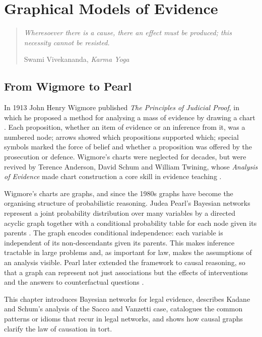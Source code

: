 \chapter{Graphical Models of Evidence}
\label{ch:graphs}

\begin{quote}\itshape
Wheresoever there is a cause, there an effect must be produced; this necessity cannot be resisted.
\par\hfill\normalfont Swami Vivekananda, \emph{Karma Yoga}
\end{quote}

\section{From Wigmore to Pearl}

In 1913 John Henry Wigmore published \emph{The Principles of Judicial Proof}, in which he proposed a method for analysing a mass of evidence by drawing a chart \citep{wigmore1913}. Each proposition, whether an item of evidence or an inference from it, was a numbered node; arrows showed which propositions supported which; special symbols marked the force of belief and whether a proposition was offered by the prosecution or defence. Wigmore's charts were neglected for decades, but were revived by Terence Anderson, David Schum and William Twining, whose \emph{Analysis of Evidence} made chart construction a core skill in evidence teaching \citep{anderson2005}.

Wigmore's charts are graphs, and since the 1980s graphs have become the organising structure of probabilistic reasoning. Judea Pearl's Bayesian networks represent a joint probability distribution over many variables by a directed acyclic graph together with a conditional probability table for each node given its parents \citep{pearl1988}. The graph encodes conditional independence: each variable is independent of its non-descendants given its parents. This makes inference tractable in large problems and, as important for law, makes the assumptions of an analysis visible. Pearl later extended the framework to causal reasoning, so that a graph can represent not just associations but the effects of interventions and the answers to counterfactual questions \citep{pearl2009}.

This chapter introduces Bayesian networks for legal evidence, describes Kadane and Schum's analysis of the Sacco and Vanzetti case, catalogues the common patterns or idioms that recur in legal networks, and shows how causal graphs clarify the law of causation in tort.

